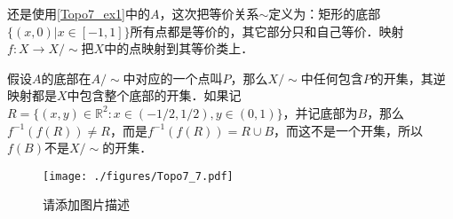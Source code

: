 \begin{example}{}

还是使用\autoref{Topo7_ex1}中的$A$，这次把等价关系$\sim$定义为：矩形的底部$\{(x,0)|x\in[-1,1]\}$所有点都是等价的，其它部分只和自己等价．映射$f:X\rightarrow X/\sim$把$X$中的点映射到其等价类上．

假设$A$的底部在$A/\sim$中对应的一个点叫$P$，那么$X/\sim$中任何包含$P$的开集，其逆映射都是$X$中包含整个底部的开集．如果记$R=\{(x,y)\in\mathbb{R}^2:x\in(-1/2,1/2),y\in(0,1)\}$，并记底部为$B$，那么$f^{-1}(f(R))\not=R$，而是$f^{-1}(f(R))=R\cup B$，而这不是一个开集，所以$f(B)$不是$X/\sim$的开集．

\begin{figure}[ht]
\centering
\texttt{[image: ./figures/Topo7\_7.pdf]}
\caption{请添加图片描述} \label{Topo7_fig7}
\end{figure}

\end{example}



